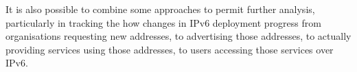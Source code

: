 It is also possible to combine some approaches to permit further analysis,
particularly in tracking the how changes in IPv6 deployment progress from
organisations requesting new addresses, to advertising those addresses, to
actually providing services using those addresses, to users accessing those
services over IPv6.





